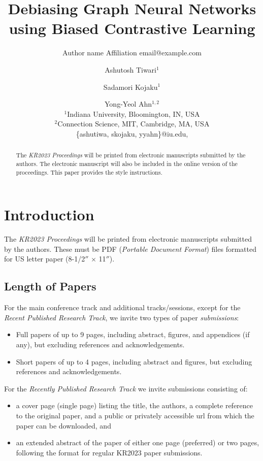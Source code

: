 \documentclass{article}
\title{Debiasing Graph Neural Networks using Biased Contrastive Learning}
\author{%
    Author name
    \affiliations
    Affiliation
    \emails
    email@example.com    %
}
\author{%
Ashutosh Tiwari$^1$\and
Sadamori Kojaku$^1$\and
Yong-Yeol Ahn$^{1,2}$\\
\affiliations
$^1$Indiana University, Bloomington, IN, USA\\
$^2$Connection Science, MIT, Cambridge, MA, USA\\
\emails
\{ashutiwa, skojaku, yyahn\}@iu.edu,
}
\begin{document}
\maketitle

\begin{abstract}
  The \textit{KR2023 Proceedings} will be printed from electronic
  manuscripts submitted by the authors. The electronic man\-u\-script will
  also be included in the online version of the proceedings. This paper
  provides the style instructions.
\end{abstract}

\section{Introduction}

The \textit{KR2023 Proceedings} will be printed from electronic
manuscripts submitted by the authors. These must be PDF (\emph{Portable
Document Format}) files formatted for US letter paper (8-1/2$''$ $\times$ 11$''$).

\subsection{Length of Papers}

For the main conference track and additional tracks/sessions, except for the
\emph{Recent Published Research Track}, we invite two types of paper
\emph{submissions}:
\begin{itemize}
\item Full papers of up to 9 pages, including abstract, figures, and appendices
  (if any), but excluding references and acknowledgements.
\item Short papers of up to 4 pages, including abstract and figures, but excluding
 references and acknowledgements.
\end{itemize}

For the \emph{Recently Published Research Track} we invite submissions consisting
of:
\begin{itemize}
\item a cover page (single page) listing the title, the authors, a complete
  reference to the original paper, and a public or privately accessible url
  from which the paper can be downloaded, and
\item an extended abstract of the paper of either one page (preferred) or two
  pages, following the format for regular KR2023 paper submissions.
\end{itemize}
\end{document}
